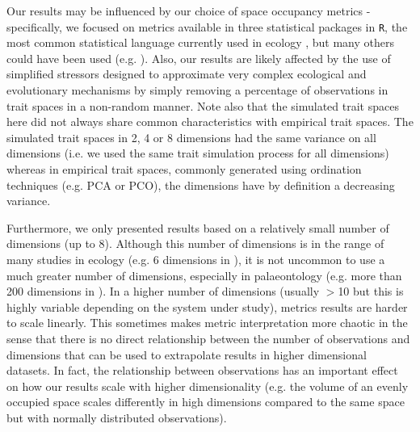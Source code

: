 \documentclass[12pt,letterpaper]{article}
\begin{document}
Our results may be influenced by our choice of space occupancy metrics - specifically, we focused on metrics available in three statistical packages in \texttt{R}, the most common statistical language currently used in ecology \citep{lai2019evaluating}, but many others could have been used (e.g. \citealt{guillerme2020shifting}).
Also, our results are likely affected by the use of simplified stressors designed to approximate very complex ecological and evolutionary mechanisms by simply removing a percentage of observations in trait spaces in a non-random manner.
Note also that the simulated trait spaces here did not always share common characteristics with empirical trait spaces.
The simulated trait spaces in 2, 4 or 8 dimensions had the same variance on all dimensions (i.e. we used the same trait simulation process for all dimensions) whereas in empirical trait spaces, commonly generated using ordination techniques (e.g. PCA or PCO), the dimensions have by definition a decreasing variance.

Furthermore, we only presented results based on a relatively small number of dimensions (up to 8).
Although this number of dimensions is in the range of many studies in ecology (e.g. 6 dimensions in \citealt{healy2019animal}), it is not uncommon to use a much greater number of dimensions, especially in palaeontology (e.g. more than 200 dimensions in \citealt{van2023should}).
In a higher number of dimensions (usually $>$10 but this is highly variable depending on the system under study), metrics results are harder to scale linearly.
This sometimes makes metric interpretation more chaotic \cite{bellman1957dynamic} in the sense that there is no direct relationship between the number of observations and dimensions that can be used to extrapolate results in higher dimensional datasets.
In fact, the relationship between observations has an important effect on how our results scale with higher dimensionality (e.g. the volume of an evenly occupied space scales differently in high dimensions compared to the same space but with normally distributed observations).
\end{document}

